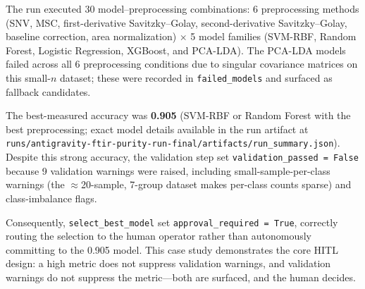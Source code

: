 The run executed 30 model--preprocessing combinations: 6 preprocessing methods
(SNV, MSC, first-derivative Savitzky--Golay, second-derivative Savitzky--Golay,
baseline correction, area normalization) $\times$ 5 model families
(SVM-RBF, Random Forest, Logistic Regression, XGBoost, and PCA-LDA).
The PCA-LDA models failed across all 6 preprocessing conditions due to
singular covariance matrices on this small-$n$ dataset; these were recorded in
\texttt{failed\_models} and surfaced as fallback candidates.

The best-measured accuracy was \textbf{0.905} (SVM-RBF or Random Forest with
the best preprocessing; exact model details available in the run artifact at
\texttt{runs/antigravity-ftir-purity-run-final/artifacts/run\_summary.json}).
Despite this strong accuracy, the validation step set
\texttt{validation\_passed = False} because 9 validation warnings were raised,
including small-sample-per-class warnings (the $\approx$20-sample, 7-group
dataset makes per-class counts sparse) and class-imbalance flags.

Consequently, \texttt{select\_best\_model} set
\texttt{approval\_required = True}, correctly routing the selection to the
human operator rather than autonomously committing to the 0.905 model.
This case study demonstrates the core HITL design: a high metric does not
suppress validation warnings, and validation warnings do not suppress the
metric---both are surfaced, and the human decides.
